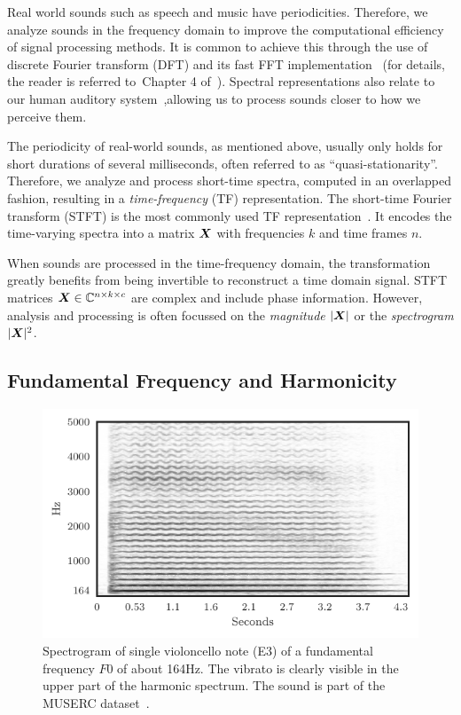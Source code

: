 Real world sounds such as speech and music have periodicities.
Therefore, we analyze sounds in the frequency domain to improve the computational efficiency of signal processing methods.
It is common to achieve this through the use of discrete Fourier transform (DFT) and its fast FFT implementation~\cite{cooley65} (for details, the reader is referred to~Chapter 4 of~\cite{proakis96}).
Spectral representations also relate to our human auditory system~\cite{zwicker13, moore89},allowing us to process sounds closer to how we perceive them.
\par
The periodicity of real-world sounds, as mentioned above, usually only holds for short durations of several milliseconds, often referred to as ``quasi-stationarity''.
Therefore, we analyze and process short-time spectra, computed in an overlapped fashion, resulting in a \emph{time-frequency} (TF) representation.
The short-time Fourier transform (STFT) is the most commonly used TF representation~\cite{mcaulay86}.
It encodes the time-varying spectra into a matrix \({\bm{X}}\) with frequencies \(k\) and time frames \(n\).
\par
When sounds are processed in the time-frequency domain, the transformation greatly benefits from being invertible to reconstruct a time domain signal.
STFT matrices \({\bm{X}} \in {\mathbb{C}}^{n \times k \times c}\) are complex and include phase information.
However, analysis and processing is often focussed  on the \emph{magnitude} \(|{\bm{X}}|\) or the \emph{spectrogram} \(|{\bm{X}}|^2\).

\subsection{Fundamental Frequency and Harmonicity}

\begin{figure}[h]
  \centering
  \includegraphics[width=0.8\columnwidth]{gfx/cello.pdf}
  \caption{Spectrogram of single violoncello note (E3) of a fundamental frequency \(F0\) of about 164\si{\hertz}. The vibrato is clearly visible in the upper part of the harmonic spectrum. The sound is part of the MUSERC dataset~\cite{stoeter15acm}.}%
  \label{fig:teaser}%
\end{figure}

